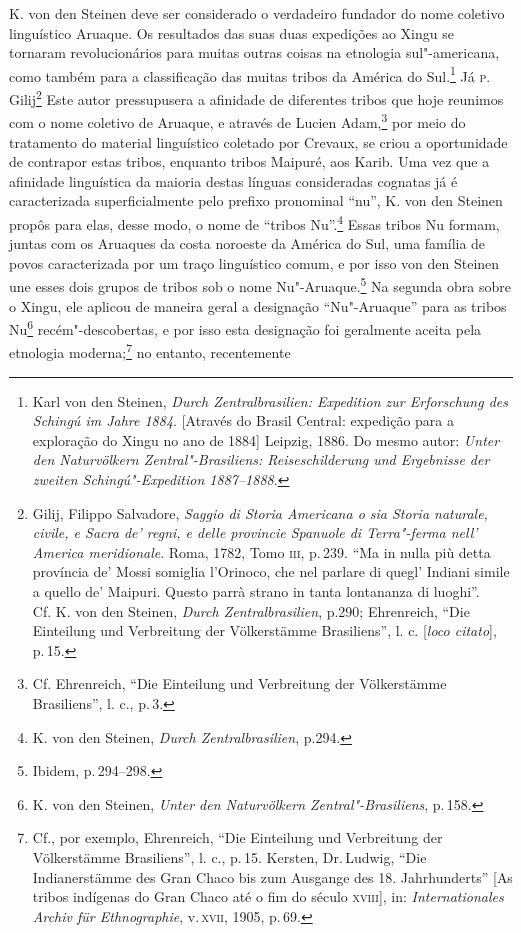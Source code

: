 K. von den Steinen deve ser considerado o verdadeiro fundador do nome
coletivo linguístico Aruaque. Os resultados das suas duas expedições ao
Xingu se tornaram revolucionários para muitas outras coisas na etnologia
sul"-americana, como também para a classificação das muitas tribos da
América do Sul.\footnote{Karl von den Steinen, \textit{Durch
  Zentralbrasilien: Expedition zur Erforschung des Schingú im Jahre
  1884}. {[}Através do Brasil Central: expedição para a exploração do
  Xingu no ano de 1884{]} Leipzig, 1886. Do mesmo autor: \textit{Unter den
  Naturvölkern Zentral"-Brasiliens: Reiseschilderung und Ergebnisse der
  zweiten Schingú"-Expedition 1887--1888}.} Já \textsc{p}.\,Gilij\footnote{Gilij,
  Filippo Salvadore, \textit{Saggio di Storia Americana o sia Storia
  naturale, civile, e Sacra de' regni, e delle provincie Spanuole di
  Terra"-ferma nell' America meridionale}. Roma, 1782, Tomo \textsc{iii}, p.\,239.
  ``Ma in nulla più detta província de' Mossi somiglia l'Orinoco, che
  nel parlare di quegl' Indiani simile a quello de' Maipuri. Questo
  parrà strano in tanta lontananza di luoghi''.\\
  Cf. K. von den Steinen, \textit{Durch Zentralbrasilien}, p.290;
  Ehrenreich, ``Die Einteilung und Verbreitung der Völkerstämme
  Brasiliens'', l. c. {[}\textit{loco citato}{]}, p.\,15.} Este autor pressupusera a afinidade de diferentes tribos que hoje
reunimos com o nome coletivo de Aruaque, e através de Lucien
Adam,\footnote{Cf. Ehrenreich, ``Die Einteilung und Verbreitung der
  Völkerstämme Brasiliens'', l. c., p.\,3.} por meio do tratamento do
material linguístico coletado por Crevaux, se criou a oportunidade de
contrapor estas tribos, enquanto tribos Maipuré, aos Karib. Uma vez que
a afinidade linguística da maioria destas línguas consideradas cognatas
já é caracterizada superficialmente pelo prefixo pronominal ``nu'', K.
von den Steinen propôs para elas, desse modo, o nome de ``tribos
Nu''.\footnote{K. von den Steinen, \textit{Durch Zentralbrasilien}, p.294.}
Essas tribos Nu formam, juntas com os Aruaques da costa noroeste da
América do Sul, uma família de povos caracterizada por um traço
linguístico comum, e por isso von den Steinen une esses dois grupos
de tribos sob o nome Nu"-Aruaque.\footnote{Ibidem, p.\,294--298.} Na
segunda obra sobre o Xingu, ele aplicou de maneira geral a
designação ``Nu"-Aruaque'' para as tribos Nu\footnote{K. von den
  Steinen, \textit{Unter den Naturvölkern Zentral"-Brasiliens}, p.\,158.}
recém"-descobertas, e por isso esta designação foi geralmente
aceita pela etnologia moderna;\footnote{Cf., por exemplo, Ehrenreich,
  ``Die Einteilung und Verbreitung der Völkerstämme Brasiliens'', l.
  c., p.\,15. Kersten, Dr.\,Ludwig, ``Die Indianerstämme des Gran Chaco
  bis zum Ausgange des 18. Jahrhunderts'' {[}As tribos indígenas do Gran
  Chaco até o fim do século \textsc{xviii}{]}, in: \textit{Internationales Archiv
  für Ethnographie}, v.\,\textsc{xvii}, 1905, p.\,69.} no entanto, recentemente
